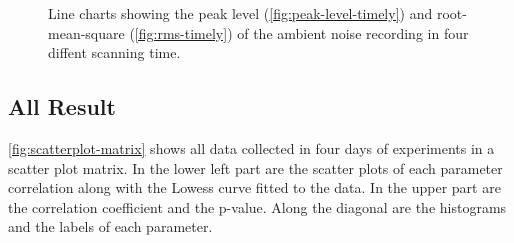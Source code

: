 	\begin{figure}[h]
		\begin{adjustwidth}{-1cm}{}
		\end{adjustwidth}
		\caption[Ambient noise in different scanning time.]
		{Line charts showing the peak level (\ref{fig:peak-level-timely}) and root-mean-square (\ref{fig:rms-timely}) of the ambient noise recording in four diffent scanning time.}
		\label{fig:audio-result-timely}
	\end{figure}



	\subsection{All Result} %
	\label{sub:all_result}
	\autoref{fig:scatterplot-matrix} shows all data collected in four days of experiments in a scatter plot matrix. In the lower left part are the scatter plots of each parameter correlation along with the Lowess curve fitted to the data. In the upper part are the correlation coefficient and the p-value. Along the diagonal are the histograms and the labels of each parameter.


